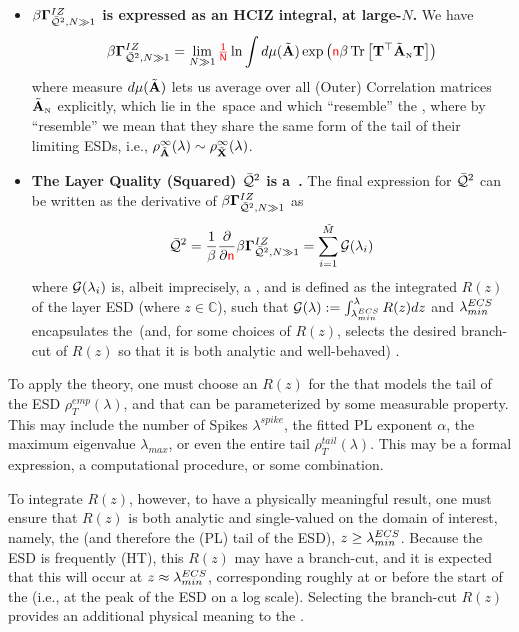\begin{itemize}
  \item
  \textbf{$\beta\mathbf{\Gamma}^{IZ}_{\bar{\mathcal{Q}}^{2},N\gg 1}$ is expressed as an HCIZ integral, at large-$N$.}
  We have
  \begin{align}
  \label{eqn:IZGINF_HCIZ}
  \IZGINF = \lim_{N\gg 1}\red{\tfrac{1}{N}}\ln\int d\mu(\AECS)\exp\left(\ND\beta\Trace{\mathbf{T}^{\TR}\AECSN\mathbf{T}}\right) %
  \end{align}
  where  measure $d\mu(\tilde{\mathbf{A}})$ lets us average over all (Outer) \Student Correlation matrices $\tilde{\mathbf{A}}_{\text{\tiny N}}$ explicitly, which
  lie in the~\ECS space and which ``resemble'' the \Teacher, 
  where by ``resemble'' we mean that they share the same form of the tail of
  their limiting ESDs,
  i.e., $\rho^{\infty}_{\tilde{\mathbf{A}}}(\lambda)\sim\rho^{\infty}_{\tilde{\mathbf{X}}}(\lambda)$.
  \item
  \textbf{The Layer Quality (Squared) $\bar{\mathcal{Q}}^{2}$ is a~\GEN.}
  The final expression for $\bar{\mathcal{Q}}^{2}$ can be written as the derivative of $\beta\mathbf{\Gamma}^{IZ}_{\bar{\mathcal{Q}}^{2},N\gg 1}$  as
  \begin{align}
    \label{eqn:QT_result}
    \bar{\mathcal{Q}}^{2} = \dfrac{1}{\beta}\dfrac{\partial}{\partial {\color{red}\sf{n}}}\beta\mathbf{\Gamma}^{IZ}_{\bar{\mathcal{Q}}^{2},N\gg 1} = \sum_{i=1}^{\tilde{M}}\mathcal{G}(\lambda_{i})
  \end{align}
  where $\mathcal{G}(\lambda_{i})$ is, albeit imprecisely, a \emph{\GEN}, and is  defined as the integrated \emph{\RTransform} $R(z)$ of the \Teacher
  layer ESD (where $z\in\mathbb{C}$), such that $\mathcal{G(\lambda)}:= \int_{\lambda^{ECS}_{min}}^{\lambda}R(z)dz$
  and $\lambda^{ECS}_{min}$  encapsulates  the~\ECS (and, for some choices of $R(z)$,  selects the desired branch-cut of $R(z)$
  so that it is both analytic and well-behaved) .
\end{itemize}

To apply the theory, one must choose an \RTransform $R(z)$ for	the \Teacher that models 
the tail of the ESD $\rho^{emp}_{T}(\lambda)$, and that can be
parameterized by some measurable property.
This may include the number of Spikes $\lambda^{spike}$, the fitted PL exponent $\alpha$,
the maximum eigenvalue $\lambda_{max}$, or even the entire tail $\rho^{tail}_{T}(\lambda)$.
This may be a formal expression, a computational procedure, or some combination.

To integrate $R(z)$, however, to have a physically meaningful result,
one must ensure that $R(z)$ is both
analytic and single-valued on the domain of interest, namely, the \ECS (and therefore
the (PL) tail of the ESD),  $z \ge \lambda^{ECS}_{min}$.
Because the ESD is frequently \HeavyTailed (HT), this
\RTransform $R(z)$ may have a branch-cut, and it is expected that this will occur
at $z\approx\lambda^{ECS}_{min}$, corresponding roughly at or before the start of the \ECS (i.e., at the peak of the ESD on a log scale).
Selecting the branch-cut $R(z)$ provides an additional physical meaning to the \ECS.

